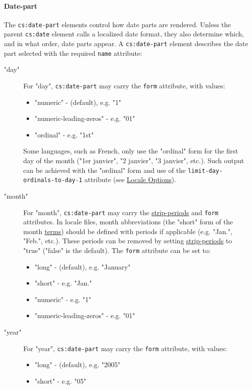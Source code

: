 \hypertarget{date-part}{%
\paragraph{Date-part}\label{date-part}}

The \texttt{cs:date-part} elements control how date parts are rendered.
Unless the parent \texttt{cs:date} element calls a localized date
format, they also determine which, and in what order, date parts appear.
A \texttt{cs:date-part} element describes the date part selected with
the required \texttt{name} attribute:

\begin{description}
\item["day"]
For "day", \texttt{cs:date-part} may carry the \texttt{form} attribute,
with values:

\begin{itemize}
\tightlist
\item
  "numeric" - (default), e.g. "1"
\item
  "numeric-leading-zeros" - e.g. "01"
\item
  "ordinal" - e.g. "1st"
\end{itemize}

Some languages, such as French, only use the "ordinal" form for the
first day of the month ("1er janvier", "2 janvier", "3 janvier", etc.).
Such output can be achieved with the "ordinal" form and use of the
\texttt{limit-day-ordinals-to-day-1} attribute (see
\protect\hyperlink{locale-options}{Locale Options}).
\item["month"]
For "month", \texttt{cs:date-part} may carry the
\protect\hyperlink{strip-periods}{strip-periods} and \texttt{form}
attributes. In locale files, month abbreviations (the "short" form of
the month \protect\hyperlink{terms}{terms}) should be defined with
periods if applicable (e.g. "Jan.", "Feb.", etc.). These periods can be
removed by setting \protect\hyperlink{strip-periods}{strip-periods} to
"true" ("false" is the default). The \texttt{form} attribute can be set
to:

\begin{itemize}
\tightlist
\item
  "long" - (default), e.g. "January"
\item
  "short" - e.g. "Jan."
\item
  "numeric" - e.g. "1"
\item
  "numeric-leading-zeros" - e.g. "01"
\end{itemize}
\item["year"]
For "year", \texttt{cs:date-part} may carry the \texttt{form} attribute,
with values:

\begin{itemize}
\tightlist
\item
  "long" - (default), e.g. "2005"
\item
  "short" - e.g. "05"
\end{itemize}
\end{description}

